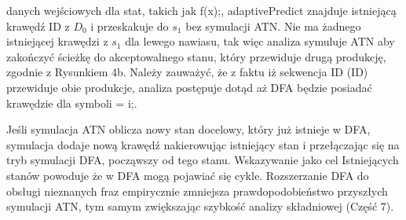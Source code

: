 danych wejściowych dla stat, takich jak f(x);, adaptivePredict znajduje
istniejącą krawędź ID z $D_0$ i przeskakuje do $s_1$ bez symulacji ATN.
Nie ma żadnego istniejącej krawędzi z $s_1$ dla lewego nawiasu, tak więc analiza
symuluje ATN aby zakończyć ścieżkę do akceptowalnego stanu,
który przewiduje drugą produkcję, zgodnie z Rysunkiem 4b.
Należy zauważyć, że z faktu iż sekwencja ID (ID) przewiduje obie produkcje,
analiza postępuje dotąd aż DFA będzie posiadać krawędzie dla symboli = i;.
\par
Jeśli symulacja ATN oblicza nowy stan docelowy, który już istnieje w DFA,
symulacja dodaje nową krawędź nakierowując istniejący stan i przełączając się
na tryb symulacji DFA, począwszy od tego stanu. Wskazywanie jako cel Istniejących
stanów powoduje że w DFA mogą pojawiać się cykle.
Rozszerzanie DFA do obsługi nieznanych fraz empirycznie zmniejsza
prawdopodobieństwo przyszłych symulacji ATN, tym samym zwiększając szybkość
analizy składniowej (Część 7). 
